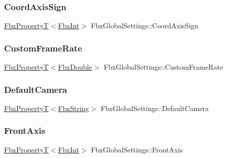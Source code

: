 \subsubsection{\texorpdfstring{Coord\+Axis\+Sign}{CoordAxisSign}}
{\footnotesize\ttfamily \hyperlink{class_fbx_property_t}{Fbx\+PropertyT}$<$\hyperlink{fbxtypes_8h_a088fa96de3b0b3ea69f0f6afef525dfb}{Fbx\+Int}$>$ Fbx\+Global\+Settings\+::\+Coord\+Axis\+Sign\hspace{0.3cm}{\ttfamily [protected]}}

\mbox{\label{class_fbx_global_settings_a4d9660899e5c2a3bd45c962f062ffbe5}} 
\subsubsection{\texorpdfstring{Custom\+Frame\+Rate}{CustomFrameRate}}
{\footnotesize\ttfamily \hyperlink{class_fbx_property_t}{Fbx\+PropertyT}$<$\hyperlink{fbxtypes_8h_a171e72a1c46fc15c1a6c9c31948c1c5b}{Fbx\+Double}$>$ Fbx\+Global\+Settings\+::\+Custom\+Frame\+Rate\hspace{0.3cm}{\ttfamily [protected]}}

\mbox{\label{class_fbx_global_settings_ae22135d96da50b31043a31bdf8815daf}} 
\subsubsection{\texorpdfstring{Default\+Camera}{DefaultCamera}}
{\footnotesize\ttfamily \hyperlink{class_fbx_property_t}{Fbx\+PropertyT}$<$\hyperlink{class_fbx_string}{Fbx\+String}$>$ Fbx\+Global\+Settings\+::\+Default\+Camera\hspace{0.3cm}{\ttfamily [protected]}}

\mbox{\label{class_fbx_global_settings_a48a64f3e8d881ee0f44053786561a59a}} 
\subsubsection{\texorpdfstring{Front\+Axis}{FrontAxis}}
{\footnotesize\ttfamily \hyperlink{class_fbx_property_t}{Fbx\+PropertyT}$<$\hyperlink{fbxtypes_8h_a088fa96de3b0b3ea69f0f6afef525dfb}{Fbx\+Int}$>$ Fbx\+Global\+Settings\+::\+Front\+Axis\hspace{0.3cm}{\ttfamily [protected]}}

